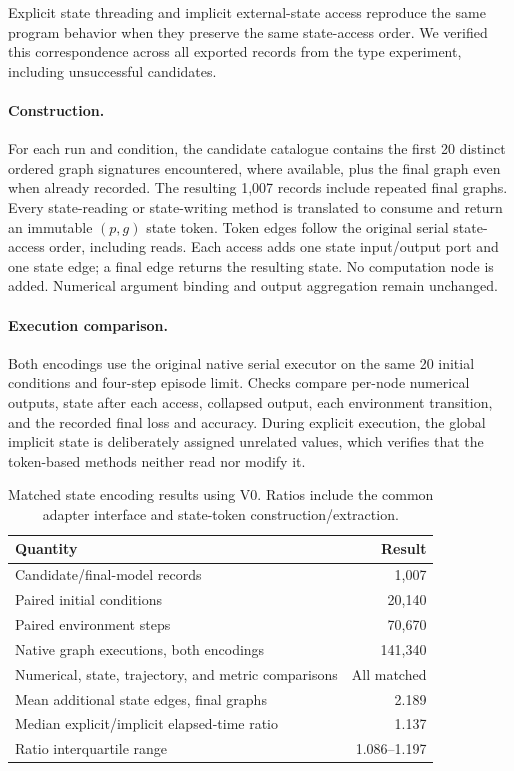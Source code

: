 Explicit state threading and implicit external-state access reproduce the same
program behavior when they preserve the same state-access order. We verified
this correspondence across all exported records from the type experiment,
including unsuccessful candidates.

\paragraph{Construction.}
For each run and condition, the candidate catalogue contains the first 20
distinct ordered graph signatures encountered, where available, plus the final
graph even when already recorded. The resulting 1,007 records include repeated
final graphs. Every state-reading or state-writing method is translated to
consume and return an immutable $(p,g)$ state token. Token edges follow the
original serial state-access order, including reads. Each access adds one state
input/output port and one state edge; a final edge returns the resulting state.
No computation node is added. Numerical argument binding and output aggregation
remain unchanged.

\paragraph{Execution comparison.}
Both encodings use the original native serial executor on the same 20 initial
conditions and four-step episode limit. Checks compare per-node numerical
outputs, state after each access, collapsed output, each environment transition,
and the recorded final loss and accuracy. During explicit execution, the global
implicit state is deliberately assigned unrelated values, which verifies that
the token-based methods neither read nor modify it.

\begin{table}[tb]
\centering
\small
\caption{Matched state encoding results using V0. Ratios include the common
adapter interface and state-token construction/extraction.}
\label{tab:revision_encoding_full}
\begin{tabular}{lr}
\toprule
Quantity & Result \\
\midrule
Candidate/final-model records & 1,007 \\
Paired initial conditions & 20,140 \\
Paired environment steps & 70,670 \\
Native graph executions, both encodings & 141,340 \\
Numerical, state, trajectory, and metric comparisons & All matched \\
Mean additional state edges, final graphs & 2.189 \\
Median explicit/implicit elapsed-time ratio & 1.137 \\
Ratio interquartile range & 1.086--1.197 \\
\bottomrule
\end{tabular}
\end{table}

